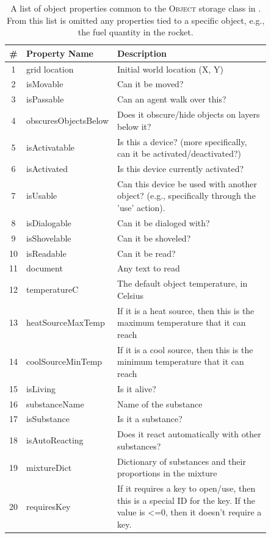 \begin{table}[t!]
\centering
\scriptsize
\caption{A list of object properties common to the \textsc{Object} storage class in \env. From this list is omitted any properties tied to a specific object, e.g., the fuel quantity in the rocket.}
\label{tab:object-properties}
\begin{tabular}{cp{0.20\linewidth}p{0.65\linewidth}}
\toprule
\textbf{\#} & \textbf{Property Name} & \textbf{Description} \\
\midrule
1 & grid location & Initial world location (X, Y) \\
2 & isMovable & Can it be moved? \\
3 & isPassable & Can an agent walk over this? \\
4 & obscuresObjectsBelow & Does it obscure/hide objects on layers below it? \\
5 & isActivatable & Is this a device? (more specifically, can it be activated/deactivated?) \\
6 & isActivated & Is this device currently activated? \\
7 & isUsable & Can this device be used with another object? (e.g., specifically through the 'use' action). \\
8 & isDialogable & Can it be dialoged with? \\
9 & isShovelable & Can it be shoveled? \\
10 & isReadable & Can it be read? \\
11 & document & Any text to read \\
12 & temperatureC & The default object temperature, in Celsius \\
13 & heatSourceMaxTemp & If it is a heat source, then this is the maximum temperature that it can reach \\
14 & coolSourceMinTemp & If it is a cool source, then this is the minimum temperature that it can reach \\
15 & isLiving & Is it alive? \\
16 & substanceName & Name of the substance \\
17 & isSubstance & Is it a substance? \\
18 & isAutoReacting & Does it react automatically with other substances? \\
19 & mixtureDict & Dictionary of substances and their proportions in the mixture \\
20 & requiresKey & If it requires a key to open/use, then this is a special ID for the key. If the value is <=0, then it doesn't require a key. \\

\end{tabular}
\end{table}
